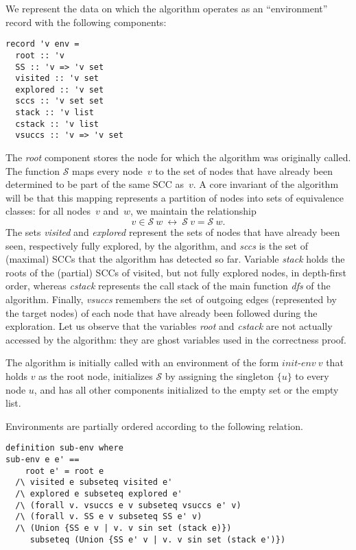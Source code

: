 \documentclass[sigplan,10pt,anonymous,review]{acmart}
\newcommand{\prog}[1]{\textit{#1}}
\renewcommand{\SS}{\mathcal{S}}
\begin{document}
We represent the data on which the algorithm operates as an ``environment'' record with the following components:

\begin{small}
\begin{lstlisting}[language=isabelle]
record 'v env =
  root :: 'v
  SS :: 'v => 'v set
  visited :: 'v set
  explored :: 'v set
  sccs :: 'v set set
  stack :: 'v list
  cstack :: 'v list
  vsuccs :: 'v => 'v set
\end{lstlisting}
\end{small}

The \prog{root} component stores the node for which the algorithm was originally called.
The function $\SS$ maps every node~$v$ to the set of nodes that have already been determined to be part of the same SCC as~$v$.
A core invariant of the algorithm will be that this mapping represents a partition of nodes into sets of equivalence classes: for all nodes~$v$ and~$w$, we maintain the relationship
\[
  v \in \SS~w\ \longleftrightarrow\ \SS~v = \SS~w.
\]
The sets \prog{visited} and \prog{explored} represent the sets of nodes that have already been seen, respectively fully explored, by the algorithm, and \prog{sccs} is the set of (maximal) SCCs that the algorithm has detected so far. Variable \prog{stack} holds the roots of the (partial) SCCs of visited, but not fully explored nodes, in depth-first order, whereas \prog{cstack} represents the call stack of the main function \prog{dfs} of the algorithm. Finally, \prog{vsuccs} remembers the set of outgoing edges (represented by the target nodes) of each node that have already been followed during the exploration. Let us observe that the variables \prog{root} and \prog{cstack} are not actually accessed by the algorithm: they are ghost variables used in the correctness proof.

The algorithm is initially called with an environment of the form $\prog{init-env}~v$ that holds $v$ as the root node, initializes $\SS$ by assigning the singleton $\{u\}$ to every node $u$, and has all other components initialized to the empty set or the empty list.

Environments are partially ordered according to the following relation.

\begin{small}
\begin{lstlisting}[language=isabelle]
definition sub-env where
sub-env e e' ==
    root e' = root e
  /\ visited e subseteq visited e'
  /\ explored e subseteq explored e'
  /\ (forall v. vsuccs e v subseteq vsuccs e' v)
  /\ (forall v. SS e v subseteq SS e' v)
  /\ (Union {SS e v | v. v sin set (stack e)})
     subseteq (Union {SS e' v | v. v sin set (stack e')})
\end{lstlisting}
\end{small}
\end{document}
